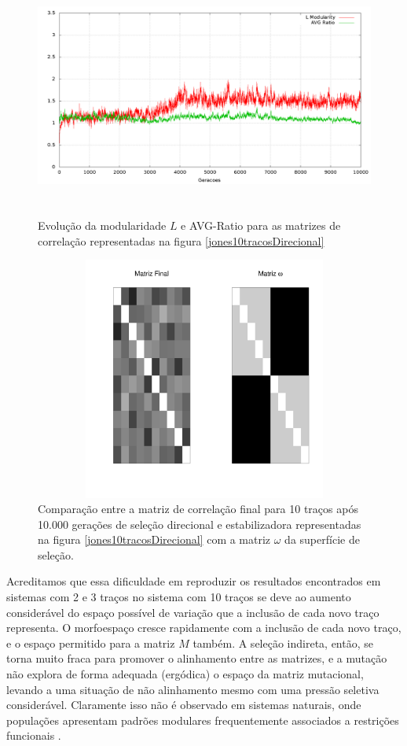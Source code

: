 \begin{figure}[htbp]
  \centering
  \includegraphics[width=150mm, height=80mm]{figuras/jones10tracosDirecionalStats.png}
  \caption{Evolução da modularidade $L$ e AVG-Ratio para as matrizes de
  correlação representadas na figura \ref{jones10tracosDirecional}}
  \label{jones10tracosDirecionalStats}
\end{figure}



\begin{figure}[htbp]
  \centering
  \includegraphics[width=150mm, height=80mm]{figuras/Mat10tracosDirecional}
   \caption{Comparação entre a matriz de correlação final para 10 traços
   após 10.000 gerações de seleção direcional e estabilizadora
   representadas na figura \ref{jones10tracosDirecional} com a matriz
   $\omega$ da superfície de seleção.}
  \label{MatJones10tracosDirecional}
\end{figure}


Acreditamos que essa dificuldade em reproduzir os resultados encontrados
em sistemas com 2 e 3 traços no sistema com 10 traços se deve ao aumento
considerável do espaço possível de variação que a inclusão de cada novo
traço representa. 
O morfoespaço cresce rapidamente com a inclusão de cada novo traço, e
o espaço permitido para a matriz $M$ também. 
A seleção indireta, então, se torna muito fraca para promover o
alinhamento entre as matrizes, e a mutação não explora de forma adequada
(ergódica) o espaço da matriz mutacional, levando a uma situação de não alinhamento
mesmo com uma pressão seletiva considerável. 
Claramente isso não é observado em sistemas naturais, onde populações
apresentam padrões modulares frequentemente associados a restrições
funcionais \citep{Porto2008}. 

